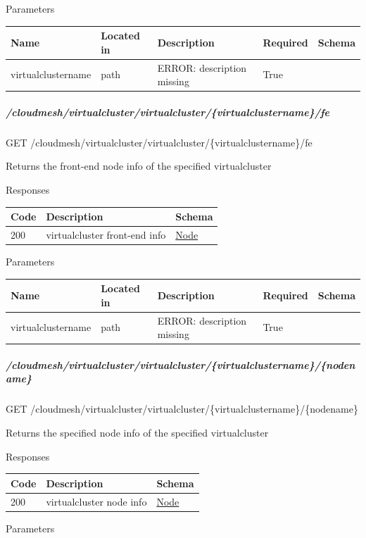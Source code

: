 \documentclass[9pt,]{article}
\let\oldsubparagraph\subparagraph
\renewcommand{\subparagraph}[1]{\oldsubparagraph{#1}\mbox{}}
\begin{document}
Parameters

\begin{longtable}[]{@{}lllll@{}}
\toprule
Name & Located in & Description & Required & Schema\tabularnewline
\midrule
\endhead
virtualclustername & path & ERROR: description missing & True
&\tabularnewline
\bottomrule
\end{longtable}

\hypertarget{cloudmeshvirtualclustervirtualclustervirtualclusternamefe}{%
\subparagraph{/cloudmesh/virtualcluster/virtualcluster/\{virtualclustername\}/fe}\label{cloudmeshvirtualclustervirtualclustervirtualclusternamefe}}

GET /cloudmesh/virtualcluster/virtualcluster/\{virtualclustername\}/fe

Returns the front-end node info of the specified virtualcluster

Responses

\begin{longtable}[]{@{}lll@{}}
\toprule
Code & Description & Schema\tabularnewline
\midrule
\endhead
200 & virtualcluster front-end info &
\protect\hyperlink{node}{Node}\tabularnewline
\bottomrule
\end{longtable}

Parameters

\begin{longtable}[]{@{}lllll@{}}
\toprule
Name & Located in & Description & Required & Schema\tabularnewline
\midrule
\endhead
virtualclustername & path & ERROR: description missing & True
&\tabularnewline
\bottomrule
\end{longtable}

\hypertarget{cloudmeshvirtualclustervirtualclustervirtualclusternamenodename}{%
\subparagraph{/cloudmesh/virtualcluster/virtualcluster/\{virtualclustername\}/\{nodename\}}\label{cloudmeshvirtualclustervirtualclustervirtualclusternamenodename}}

GET
/cloudmesh/virtualcluster/virtualcluster/\{virtualclustername\}/\{nodename\}

Returns the specified node info of the specified virtualcluster

Responses

\begin{longtable}[]{@{}lll@{}}
\toprule
Code & Description & Schema\tabularnewline
\midrule
\endhead
200 & virtualcluster node info &
\protect\hyperlink{node}{Node}\tabularnewline
\bottomrule
\end{longtable}

Parameters
\end{document}
